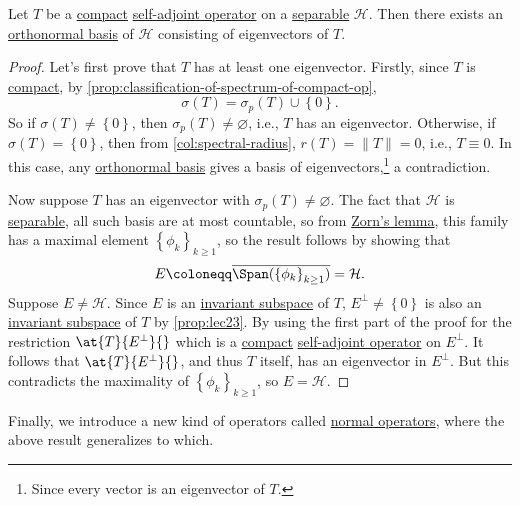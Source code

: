 \begin{theorem}\label{thm:spectral-theorem-for-compact-self-adjoint-op}
	Let \(T\) be a \hyperref[def:compact-op]{compact} \hyperref[def:self-adjoint-op]{self-adjoint operator} on a \hyperref[def:separable]{separable} \(\mathcal{H} \). Then there exists an \hyperref[def:orthonormal-basis]{orthonormal basis} of \(\mathcal{H} \) consisting of eigenvectors of \(T\).
\end{theorem}
\begin{proof}
	Let's first prove that \(T\) has at least one eigenvector. Firstly, since \(T\) is \hyperref[def:compact-op]{compact}, by \autoref{prop:classification-of-spectrum-of-compact-op},
	\[
		\sigma (T) = \sigma _p(T) \cup \left\{ 0 \right\}.
	\]
	So if \(\sigma (T) \neq \left\{ 0 \right\} \), then \(\sigma _p(T) \neq \varnothing \), i.e., \(T\) has an eigenvector. Otherwise, if \(\sigma (T) = \left\{ 0 \right\} \), then from \autoref{col:spectral-radius}, \(r(T) = \lVert T \rVert = 0\), i.e., \(T \equiv 0\). In this case, any \hyperref[def:orthonormal-basis]{orthonormal basis} gives a basis of eigenvectors,\footnote{Since every vector is an eigenvector of \(T\).} a contradiction.

	Now suppose \(T\) has an eigenvector with \(\sigma_p (T) \neq \varnothing \). The fact that \(\mathcal{H} \) is \hyperref[def:separable]{separable}, all such basis are at most countable, so from \href{https://en.wikipedia.org/wiki/Zorn%27s_lemma}{Zorn's lemma}, this family has a maximal element \(\left\{ \phi _k \right\}_{k\geq 1} \), so the result follows by showing that 
	\[
		E \coloneqq \overline{\Span(\left\{ \phi _k \right\}_{k\geq 1} )} = \mathcal{H} .
	\]
	Suppose \(E \neq \mathcal{H} \). Since \(E\) is an \hyperref[def:invariant-subspace]{invariant subspace} of \(T\), \(E^{\perp} \neq \left\{ 0 \right\} \) is also an \hyperref[def:invariant-subspace]{invariant subspace} of \(T\) by \autoref{prop:lec23}. By using the first part of the proof for the restriction \(\at{T}{E^{\perp} }{} \) which is a \hyperref[def:compact-op]{compact} \hyperref[def:self-adjoint-op]{self-adjoint operator} on \(E^{\perp} \). It follows that \(\at{T}{E^{\perp} }{} \), and thus \(T\) itself, has an eigenvector in \(E^{\perp} \). But this contradicts the maximality of \(\left\{ \phi _k \right\}_{k\geq 1} \), so \(E = \mathcal{H} \).
\end{proof}

Finally, we introduce a new kind of operators called \hyperref[def:normal-op]{normal operators}, where the above result generalizes to which.

